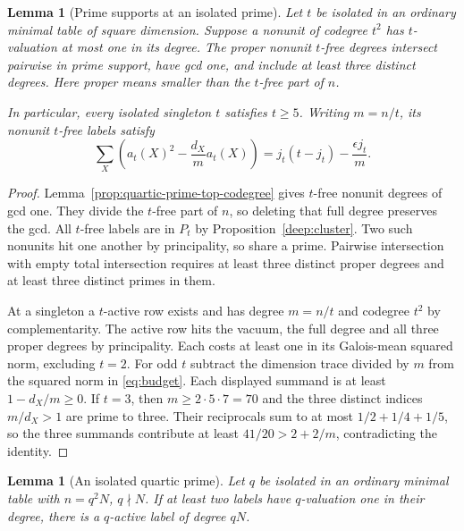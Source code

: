 \documentclass[11pt,a4paper]{article}
\numberwithin{equation}{section}
\newtheorem{lemma}[theorem]{Lemma}
\theoremstyle{remark}
\begin{document}
\begin{lemma}[Prime supports at an isolated prime]\label{lem:isolated-dyadic-square}
Let $t$ be isolated in an ordinary minimal table of square dimension.
Suppose a nonunit of codegree $t^2$ has $t$-valuation at most one in
its degree. The proper nonunit $t$-free degrees intersect pairwise in
prime support, have gcd one, and include at least three distinct degrees.
Here proper means smaller than the $t$-free part of $n$.

In particular, every isolated singleton $t$ satisfies $t\ge5$.
Writing $m=n/t$, its nonunit $t$-free labels satisfy
\[
 \sum_X\left(a_t(X)^2-\frac{d_X}{m}a_t(X)\right)
       =j_t(t-j_t)-\frac{\epsilon j_t}{m}.
\]
\end{lemma}
\begin{proof}
Lemma~\ref{prop:quartic-prime-top-codegree} gives $t$-free
nonunit degrees of gcd one. They divide the $t$-free part of $n$,
so deleting that full degree preserves the gcd.
All $t$-free labels are in $P_t$ by Proposition~\ref{deep:cluster}.
Two such nonunits hit one another by principality, so share a prime.
Pairwise intersection with empty total intersection requires at least
three distinct proper degrees and at least three distinct primes in them.

At a singleton a $t$-active row exists and has degree $m=n/t$ and
codegree $t^2$ by complementarity.
The active row hits the vacuum, the full degree and all three
proper degrees by principality. Each costs at least one in its
Galois-mean squared norm, excluding $t=2$.
For odd $t$ subtract the dimension trace divided by $m$ from the
squared norm in \eqref{eq:budget}. Each displayed summand is at least
$1-d_X/m\ge0$. If $t=3$, then $m\ge2\cdot5\cdot7=70$ and the
three distinct indices $m/d_X>1$ are prime to three. Their
reciprocals sum to at most $1/2+1/4+1/5$, so the three summands
contribute at least $41/20>2+2/m$, contradicting the identity.
\end{proof}

\begin{lemma}[An isolated quartic prime]\label{fourm:heightone}
Let $q$ be isolated in an ordinary minimal table with $n=q^2N$, $q\nmid N$. If at least two labels have $q$-valuation one in their degree, there is a $q$-active label of degree $qN$.
\end{lemma}
\end{document}
